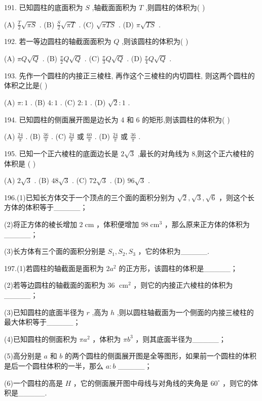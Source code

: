 \documentclass[10pt]{article}
\begin{document}
191. 已知圆柱的底面积为 \(S\) ,轴截面面积为 \(T\) ,则圆柱的体积为( )

(A) \(\frac{T}{2}\sqrt{\pi S}\) . (B) \(\frac{S}{2}\sqrt{\pi T}\) . (C) \(\sqrt{\pi TS}\) . (D) \(\pi \sqrt{TS}\) .

192. 若一等边圆柱的轴截面面积为 \(Q\) ,则该圆柱的体积为( )

(A) \({\pi Q}\sqrt{Q}\) . (B) \(\frac{\pi }{2}Q\sqrt{Q}\) . (C) \(\frac{\pi }{3}Q\sqrt{Q}\) . (D) \(\frac{\pi }{4}Q\sqrt{Q}\) .

193. 先作一个圆柱的内接正三棱柱, 再作这个三棱柱的内切圆柱, 则这两个圆柱的体积之比是( )

(A) \(\pi  : 1\) . (B) \(4 : 1\) . (C) \(2 : 1\) . (D) \(\sqrt{2} : 1\) .

194. 已知圆柱的侧面展开图是边长为 4 和 6 的矩形,则该圆柱的体积为( )

(A) \(\frac{24}{\pi }\) . (B) \(\frac{36}{\pi }\) . (C) \(\frac{24}{\pi }\) 或 \(\frac{60}{\pi }\) . (D) \(\frac{24}{\pi }\) 或 \(\frac{36}{\pi }\) .

195. 已知一个正六棱柱的底面边长是 \(2\sqrt{3}\) ,最长的对角线为 8,则这个正六棱柱的体积是 ( )

(A) \(2\sqrt{3}\) . (B) \({48}\sqrt{3}\) . (C) \({72}\sqrt{3}\) . (D) \({96}\sqrt{3}\) .

196.(1)已知长方体交于一个顶点的三个面的面积分别为 \(\sqrt{2},\sqrt{3},\sqrt{6}\) ，则这个长方体的体积等于\_\_\_\_\_；

(2)将正方体的棱长增加 \(2\mathrm{\;{cm}}\) ，体积便增加 \({98}{\mathrm{\;{cm}}}^{3}\) ，那么原来正方体的体积为\_\_\_\_\_；

(3)长方体有三个面的面积分别是 \({S}_{1},{S}_{2},{S}_{3}\) ，它的体积为\_\_\_\_\_.

197.(1)若圆柱的轴截面是面积为 \(2{a}^{2}\) 的正方形，该圆柱的体积是\_\_\_\_\_；

(2)若等边圆柱的轴截面的面积为 36 \({\mathrm{\;{cm}}}^{2}\) ，则它的内接正六棱柱的体积为\_\_\_\_\_；

(3)已知圆柱的底面半径为 \(r\) ,高为 \(h\) ,则以圆柱轴截面为一个侧面的内接三棱柱的最大体积等于\_\_\_\_\_；

(4)已知圆柱的侧面积为 \(\pi {a}^{2}\) ，体积为 \(\pi {b}^{3}\) ，则其底面半径为\_\_\_\_\_；

(5)高分别是 \(a\) 和 \(b\) 的两个圆柱的侧面展开图是全等图形，如果前一个圆柱的体积是后一个圆柱体积的一半，那么 \(a : b\) \_\_\_\_\_；

(6)一个圆柱的高是 \(H\) ，它的侧面展开图中母线与对角线的夹角是 \({60}^{ \circ  }\) ，则它的体积是\_\_\_\_\_.
\end{document}
